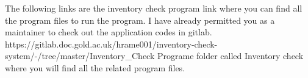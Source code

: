 The following links are the inventory check program link where you can find all the program files to run the program. I have already permitted you as a maintainer to check out the application codes in gitlab.\newline
\newline https://gitlab.doc.gold.ac.uk/hrame001/inventory-check-system/-/tree/master/Inventory\_Check\newline
\newline Programe folder called Inventory check where you will find all the related program files.